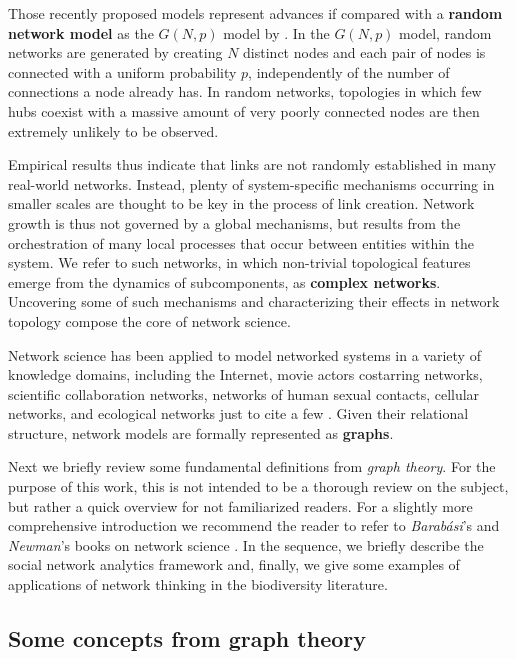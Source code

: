 Those recently proposed models represent advances if compared with a \textbf{random network model} as the $G(N,p)$ model by . In the $G(N,p)$ model, 
random networks are generated by creating $N$ distinct nodes and each pair of nodes is connected with a uniform probability $p$, independently of the number of connections a node already has. 
In random networks, topologies in which few hubs coexist with a massive amount of very poorly connected nodes are then extremely unlikely to be observed. 


Empirical results thus indicate that links are not randomly established in many real-world networks.
Instead, plenty of system-specific mechanisms occurring in smaller scales are thought to be key in the process of link creation.
Network growth is thus not governed by a global mechanisms, but results from the orchestration of many local processes that occur between entities within the system.
We refer to such networks, in which non-trivial topological features emerge from the dynamics of subcomponents, as \textbf{complex networks}.
Uncovering some of such mechanisms and characterizing their effects in network topology compose the core of network science.


Network science has been applied to model networked systems in a variety of knowledge domains, including the Internet, movie actors costarring networks, scientific collaboration networks, networks of human sexual contacts, cellular networks, and ecological networks just to cite a few \cite{Albert2002}.
Given their relational structure, network models are formally represented as \textbf{graphs}.

Next we briefly review some fundamental definitions from \textit{graph theory}.
For the purpose of this work, this is not intended to be a thorough review on the subject, but rather a quick overview for not familiarized readers. 
For a slightly more comprehensive introduction we recommend the reader to refer to \textit{Barabási}'s and \textit{Newman}'s books on network science \cite{Barabasibook,Newman2010b}.
In the sequence, we briefly describe the social network analytics framework and, 
finally, we give some examples of applications of network thinking in the biodiversity literature.


\subsection{Some concepts from graph theory}
\label{section:graphtheory}


